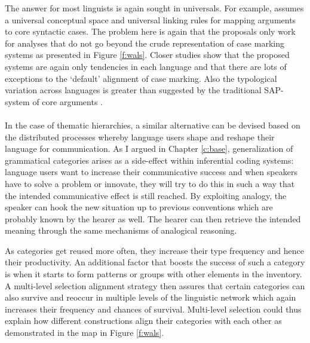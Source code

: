 The answer for most linguists is again sought in universals. For example, \citet{croft98event} assumes a universal conceptual space and universal linking rules for mapping arguments to core syntactic cases. The problem here is again that the proposals only work for analyses that do not go beyond the crude representation of case marking systems as presented in Figure \ref{f:wals}. Closer studies show that the proposed systems are again only tendencies in each language and that there are lots of exceptions to the `default' alignment of case marking. Also the typological variation across languages is greater than suggested by the traditional SAP-system of core arguments \citep{mithun05beyond}.
\\
\\
 In the case of thematic hierarchies, a similar alternative can be devised based on the distributed processes whereby language users shape and reshape their language for communication. As I argued in Chapter \ref{c:base}, generalization of grammatical categories arises as a side-effect within inferential coding systems: language users want to increase their communicative success and when speakers have to solve a problem or innovate, they will try to do this in such a way that the intended communicative effect is still reached. By exploiting analogy, the speaker can hook the new situation up to previous conventions which are probably known by the hearer as well. The hearer can then retrieve the intended meaning through the same mechanisms of analogical reasoning.

As categories get reused more often, they increase their type frequency and hence their productivity. An additional factor that boosts the success of such a category is when it starts to form patterns or groups with other elements in the inventory. A multi-level selection alignment strategy then assures that certain categories can also survive and reoccur in multiple levels of the linguistic network which again increases their frequency and chances of survival. Multi-level selection could thus explain how different constructions align their categories with each other as demonstrated in the map in Figure \ref{f:wals}.


